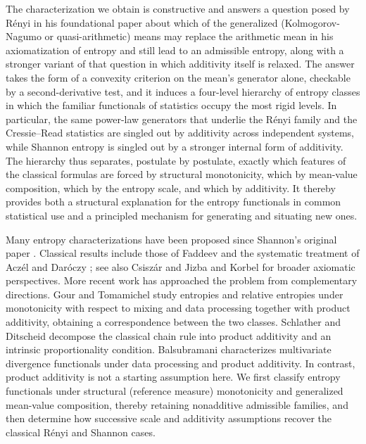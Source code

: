 \documentclass[reqno]{amsart}
\begin{document}
The characterization we obtain is constructive and answers a question posed by R\'enyi in his foundational paper \cite{Ren61} about which of the generalized (Kolmogorov-Nagumo or quasi-arithmetic) means may replace the arithmetic mean in his axiomatization of entropy and still lead to an admissible entropy, along with a stronger variant of that question in which additivity itself is relaxed. The answer takes the form of a convexity criterion on the mean's generator alone, checkable by a second-derivative test, and it induces a four-level hierarchy of entropy classes in which the familiar functionals of statistics occupy the most rigid levels. In particular, the same power-law generators that underlie the R\'enyi family and the Cressie--Read statistics are singled out by additivity across independent systems, while Shannon entropy is singled out by a stronger internal form of additivity. The hierarchy thus separates, postulate by postulate, exactly which features of the classical formulas are forced by structural monotonicity, which by mean-value composition, which by the entropy scale, and which by additivity. It thereby provides both a structural explanation for the entropy functionals in common statistical use and a principled mechanism for generating and situating new ones.



Many entropy characterizations have been proposed since Shannon's original paper \cite{Sha48}. Classical results include those of Faddeev \cite{Faddeev56} and the systematic treatment of Acz\'el and Dar\'oczy \cite{AczelDaroczy75}; see also Csisz\'ar \cite{Csi08} and Jizba and Korbel \cite{JizKor20} for broader axiomatic perspectives. More recent work has approached the problem from complementary directions. Gour and Tomamichel \cite{GourTomamichel21} study entropies and relative entropies under monotonicity with respect to mixing and data processing together with product additivity, obtaining a correspondence between the two classes. Schlather and Ditscheid \cite{SchlatherDitscheid24} decompose the classical chain rule into product additivity and an intrinsic proportionality condition. Balsubramani \cite{Balsub26} characterizes multivariate divergence functionals under data processing and product additivity. 
In contrast, product additivity is not a starting assumption here. We first classify entropy functionals under structural (reference measure) monotonicity and generalized mean-value composition, thereby retaining nonadditive admissible families, and then determine how successive scale and additivity assumptions recover the classical R\'enyi and Shannon cases.
\end{document}
